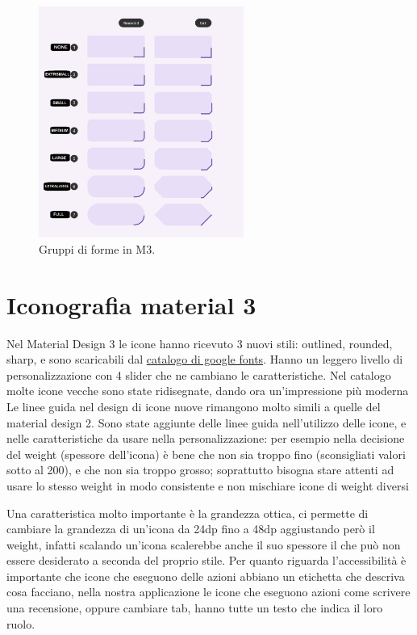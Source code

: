 \documentclass[12pt, a4paper]{report}
\begin{document}
	\begin{figure}[h]
		\centering
		\includegraphics[width=0.6\textwidth]{FormeM3} %
		\caption{Gruppi di forme in M3.}
	\end{figure}

	\section{Iconografia material 3}
		Nel Material Design 3 le icone hanno ricevuto 3 nuovi stili: outlined, rounded, sharp, e sono scaricabili dal \href{https://fonts.google.com/icons}{catalogo di google fonts}. Hanno un leggero livello di personalizzazione con 4 slider che ne cambiano le caratteristiche.
		Nel catalogo molte icone vecche sono state ridisegnate, dando ora un'impressione più moderna
		Le linee guida nel design di icone nuove rimangono molto simili a quelle del material design 2.
		Sono state aggiunte delle linee guida nell'utilizzo delle icone, e nelle caratteristiche da usare nella personalizzazione: per esempio nella decisione del weight (spessore dell'icona) è bene che non sia troppo fino (sconsigliati valori sotto al 200), e che non sia troppo grosso; soprattutto bisogna stare attenti ad usare lo stesso weight in modo consistente e non mischiare icone di weight diversi

		Una caratteristica molto importante è la grandezza ottica, ci permette di cambiare la grandezza di un'icona da 24dp fino a 48dp aggiustando però il weight, infatti scalando un'icona scalerebbe anche il suo spessore il che può non essere desiderato a seconda del proprio stile.
		Per quanto riguarda l'accessibilità è importante che icone che eseguono delle azioni abbiano un etichetta che descriva cosa facciano, nella nostra applicazione le icone che eseguono azioni come scrivere una recensione, oppure cambiare tab, hanno tutte un testo che indica il loro ruolo.
\end{document}
